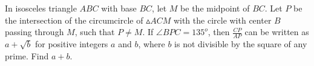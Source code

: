 In isosceles triangle $ABC$ with base $BC$, let $M$ be the midpoint of $BC$. Let $P$ be the intersection of the circumcircle of $\vartriangle ACM$ with the circle with center $B$ passing through $M$, such that $P \ne M$. If $\angle BPC = 135^o$, then $\frac{CP}{AP}$ can be written as $a +\sqrt{b}$ for positive integers $a$ and $b$, where $b$ is not divisible by the square of any prime. Find $a + b$.
